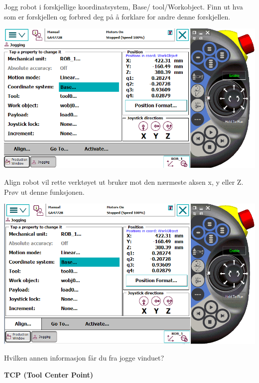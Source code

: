 Jogg robot i forskjellige koordinatsystem, Base/ tool/Workobject. Finn ut hva som er forskjellen og forbred deg på å forklare for andre denne forskjellen. 

\vspace{1cm}

\includegraphics[width=1\textwidth]{i04861x04}

\vspace{1cm}

Align robot vil rette verktøyet ut bruker mot den nærmeste aksen x, y eller Z. Prøv ut denne funksjonen. 

\vspace{1cm}

\includegraphics[width=1\textwidth]{i04861x05}

\vspace{1cm}

Hvilken annen informasjon får du fra jogge vinduet?

\vspace{1cm}


\textbf{TCP (Tool Center Point)}

\vspace{1cm}

